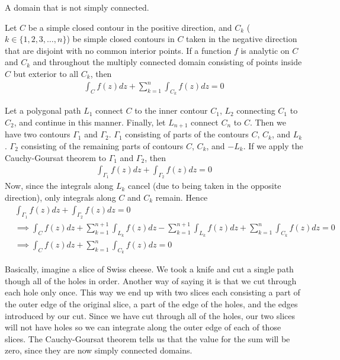 \documentclass[12pt, english]{book}
\makeatletter
\renewenvironment{proof}[1][\proofname]{\par
	\pushQED{\qed}%
	\normalfont \topsep6\p@\@plus6\p@\relax
	\list{}{%
		\settowidth{\leftmargin}{\itshape\proofname:\hskip\labelsep}%
		\setlength{\labelwidth}{0pt}%
		\setlength{\itemindent}{-\leftmargin}%
	}%
	\item[\hskip\labelsep\itshape#1\@addpunct{:}]\ignorespaces
}{%
	\popQED\endlist\@endpefalse
}
\makeatother
\begin{document}
	\begin{definition}
		A domain that is not simply connected.
	\end{definition}

	\begin{theorem}
		\label{Contour integral over Multiply Connected Domains Theorem - Complex}
		Let \(C\) be a simple closed contour in the positive direction, and \(C_k\) (\(k \in \{1,2,3,\ldots, n\}\)) be simple closed contours in \(C\) taken in the negative direction that are disjoint with no common interior points. If a function \(f\) is analytic on \(C\) and \(C_k\) and throughout the multiply connected domain consisting of points inside \(C\) but exterior to all \(C_k\), then
		\begin{align*}
			\int_{C} f(z) dz + \sum_{k=1}^{n} \int_{C_k} f(z) dz = 0
		\end{align*}
	\end{theorem}
	\begin{proof}
		Let a polygonal path \(L_1\) connect \(C\) to the inner contour \(C_1\), \(L_2\) connecting \(C_1\) to \(C_2\), and continue in this manner. Finally, let \(L_{n+1}\) connect \(C_n\) to \(C\). Then we have two contours \(\Gamma_1\) and \(\Gamma_2\). \(\Gamma_1\) consisting of parts of the contours \(C\), \(C_k\), and \(L_k\). \(\Gamma_2\) consisting of the remaining parts of contours \(C\), \(C_k\), and \(-L_k\). If we apply the Cauchy-Goursat theorem to \(\Gamma_1\) and \(\Gamma_2\), then
		\begin{align*}
			\int_{\Gamma_1} f(z) dz + \int_{\Gamma_2} f(z) dz = 0
		\end{align*}
		Now, since the integrals along \(L_k\) cancel (due to being taken in the opposite direction), only integrals along \(C\) and \(C_k\) remain. Hence
		\begin{align*}
			&\int_{\Gamma_1} f(z) dz + \int_{\Gamma_2} f(z) dz = 0 \\
			&\implies \int_{C} f(z) dz + \sum_{k=1}^{n+1} \int_{L_k} f(z) dz - \sum_{k=1}^{n+1} \int_{L_k} f(z) dz + \sum_{k=1}^{n} \int_{C_k} f(z) dz = 0 \\
			&\implies \int_{C} f(z) dz + \sum_{k=1}^{n} \int_{C_k} f(z) dz = 0
		\end{align*}
	\end{proof}

	\begin{observation}
		Basically, imagine a slice of Swiss cheese. We took a knife and cut a single path though all of the holes in order. Another way of saying it is that we cut through each hole only once. This way we end up with two slices each consisting a part of the outer edge of the original slice, a part of the edge of the holes, and the edges introduced by our cut. Since we have cut through all of the holes, our two slices will not have holes so we can integrate along the outer edge of each of those slices. The Cauchy-Goursat theorem tells us that the value for the sum will be zero, since they are now simply connected domains. 
	\end{observation}
	
\end{document}
